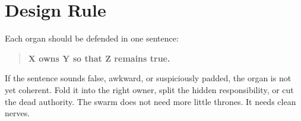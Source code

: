 \documentclass[11pt,oneside]{article}
\begin{document}
\section{Design Rule}

Each organ should be defended in one sentence:

\begin{quote}
\textbf{X owns Y so that Z remains true.}
\end{quote}

If the sentence sounds false, awkward, or suspiciously padded, the organ is not
yet coherent. Fold it into the right owner, split the hidden responsibility, or
cut the dead authority. The swarm does not need more little thrones. It needs
clean nerves.
\end{document}
